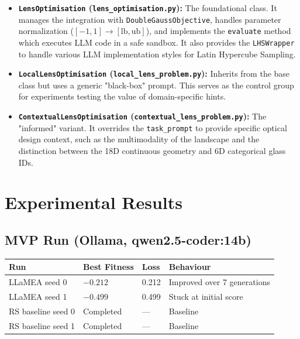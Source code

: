 \documentclass[a4paper,11pt]{article}
\begin{document}
\begin{itemize}
    \item \textbf{\texttt{LensOptimisation} (\texttt{lens\_optimisation.py}):} The foundational class. It manages the integration with \texttt{DoubleGaussObjective}, handles parameter normalization ($[-1, 1] \to [\text{lb}, \text{ub}]$), and implements the \texttt{evaluate} method which executes LLM code in a safe sandbox. It also provides the \texttt{LHSWrapper} to handle various LLM implementation styles for Latin Hypercube Sampling.
    \item \textbf{\texttt{LocalLensOptimisation} (\texttt{local\_lens\_problem.py}):} Inherits from the base class but uses a generic "black-box" prompt. This serves as the control group for experiments testing the value of domain-specific hints.
    \item \textbf{\texttt{ContextualLensOptimisation} (\texttt{contextual\_lens\_problem.py}):} The "informed" variant. It overrides the \texttt{task\_prompt} to provide specific optical design context, such as the multimodality of the landscape and the distinction between the 18D continuous geometry and 6D categorical glass IDs.
\end{itemize}

\section{Experimental Results}

\subsection{MVP Run (Ollama, qwen2.5-coder:14b)}

\begin{tabular}{llll}
\toprule
\textbf{Run} & \textbf{Best Fitness} & \textbf{Loss} & \textbf{Behaviour} \\
\midrule
LLaMEA seed 0 & $-0.212$ & 0.212 & Improved over 7 generations \\
LLaMEA seed 1 & $-0.499$ & 0.499 & Stuck at initial score \\
RS baseline seed 0 & Completed & — & Baseline \\
RS baseline seed 1 & Completed & — & Baseline \\
\bottomrule
\end{tabular}
\end{document}
